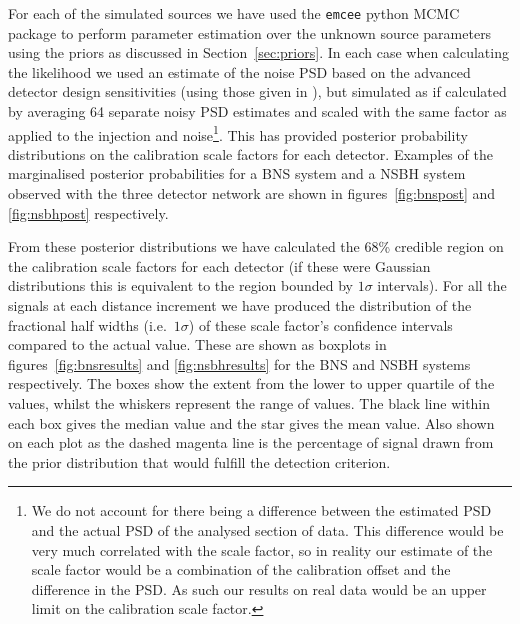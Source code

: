 \documentclass[10pt]{iopart}
\begin{document}
For each of the simulated sources we have used the {\tt emcee} python MCMC package 
\cite{2013PASP..125..306F} to perform parameter estimation over the unknown source parameters using 
the priors as discussed in Section~\ref{sec:priors}. In each case when calculating the likelihood 
we used an estimate of the noise \ac{PSD} based on the advanced detector design sensitivities 
(using those given in \cite{2013arXiv1304.0670L}), but simulated as if calculated by averaging 64 
separate noisy \ac{PSD} estimates and scaled with the same factor as applied to the injection and 
noise\footnote{We do not account for there being a difference between the estimated \ac{PSD} and the 
actual \ac{PSD} of the analysed section of data. This difference would be very much correlated with 
the scale factor, so in reality our estimate of the scale factor would be a combination of the 
calibration offset and the difference in the \ac{PSD}. As such our results on real data would be an 
upper limit on the calibration scale factor.}. This has provided posterior probability distributions 
on the calibration scale factors for each detector. Examples of the marginalised posterior 
probabilities for a \ac{BNS} system and a \ac{NSBH} system observed with the three detector network 
are shown in figures~\ref{fig:bnspost} and \ref{fig:nsbhpost} respectively.

From these posterior distributions we have calculated the 68\% credible region on the 
calibration scale factors for each detector (if these were Gaussian distributions this is 
equivalent to the region bounded by $1\sigma$ intervals). For all the signals at each distance 
increment we have produced the distribution of the fractional half widths (i.e.\ $1\sigma$) of 
these scale factor's confidence intervals compared to the actual value. These are shown as boxplots 
in figures~\ref{fig:bnsresults} and \ref{fig:nsbhresults} for the \ac{BNS} and \ac{NSBH} systems 
respectively. The boxes show the extent from the lower to upper quartile of the values, whilst the 
whiskers represent the range of values. The black line within each box gives the median value and 
the star gives the mean value. Also shown on each plot as the dashed magenta line is the percentage 
of signal drawn from the prior distribution that would fulfill the detection criterion.
\end{document}

